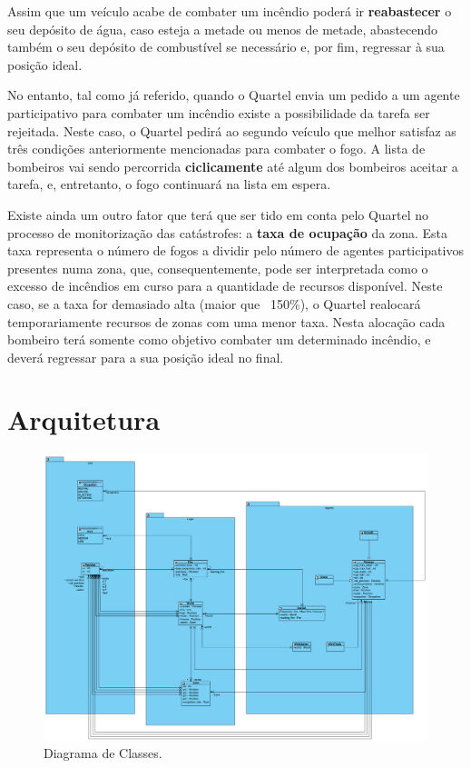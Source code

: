 \documentclass[a4paper]{article}
\begin{document}
Assim que um veículo acabe de combater um incêndio poderá ir \textbf{reabastecer} o seu depósito de água, caso esteja a metade ou menos de metade, abastecendo também o seu depósito de combustível se necessário e, por fim, regressar à sua posição ideal.

No entanto, tal como já referido, quando o Quartel envia um pedido a um agente participativo para combater um incêndio existe a possibilidade da tarefa ser rejeitada. Neste caso, o Quartel pedirá ao segundo veículo que melhor satisfaz as três condições anteriormente mencionadas para combater o fogo. A lista de bombeiros vai sendo percorrida \textbf{ciclicamente} até algum dos bombeiros aceitar a tarefa, e, entretanto, o fogo continuará na lista em espera.

Existe ainda um outro fator que terá que ser tido em conta pelo Quartel no processo de monitorização das catástrofes: a \textbf{taxa de ocupação} da zona. Esta taxa representa o número de fogos a dividir pelo número de agentes participativos presentes numa zona, que, consequentemente, pode ser interpretada como o excesso de incêndios em curso para a quantidade de recursos disponível. Neste caso, se a taxa for demasiado alta (maior que ~150\%), o Quartel realocará temporariamente recursos de zonas com uma menor taxa. Nesta alocação cada bombeiro terá somente como objetivo combater um determinado incêndio, e deverá regressar para a sua posição ideal no final.

\pagebreak
\section{Arquitetura}

\begin{figure}[h!]
    \centering
    \includegraphics[scale=0.41]{classes.png}
    \caption{Diagrama de Classes.}
    \label{img:classes}
\end{figure}
\end{document}
